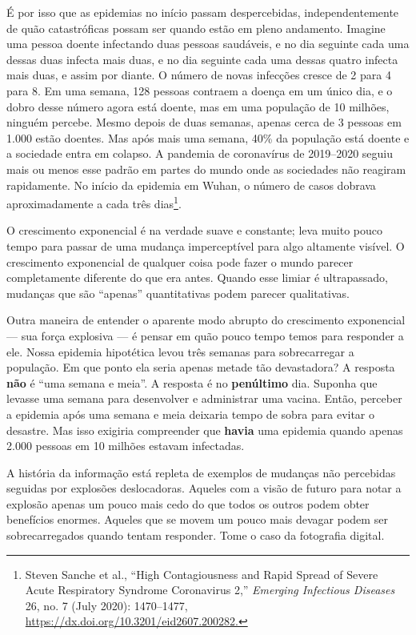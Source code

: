 É por isso que as epidemias no início passam despercebidas, independentemente de
quão catastróficas possam ser quando estão em pleno andamento. Imagine uma
pessoa doente infectando duas pessoas saudáveis, e no dia seguinte cada uma
dessas duas infecta mais duas, e no dia seguinte cada uma dessas quatro infecta 
mais duas, e assim por diante. O número de novas infecções cresce de 2 para 4 
para 8. Em uma semana, 128 pessoas contraem a doença em um único dia, e o dobro 
desse número agora está doente, mas em uma população de 10 milhões, ninguém 
percebe. Mesmo depois de duas semanas, apenas cerca de 3 pessoas em 1.000 estão 
doentes. Mas após mais uma semana, 40\% da população está doente e a sociedade 
entra em colapso. A pandemia de coronavírus de 2019--2020 seguiu mais ou menos 
esse padrão em partes do mundo onde as sociedades não reagiram rapidamente. No 
início da epidemia em Wuhan, o número de casos dobrava aproximadamente a cada 
três dias\footnote{Steven Sanche et al., ``High Contagiousness and Rapid Spread
of Severe Acute Respiratory Syndrome Coronavirus 2,'' \textit{Emerging
Infectious Diseases} 26, no. 7 (July 2020): 1470--1477,
\url{https://dx.doi.org/10.3201/eid2607.200282.}}.

O crescimento exponencial é na verdade suave e constante; leva muito pouco 
tempo para passar de uma mudança imperceptível para algo altamente visível. O 
crescimento exponencial de qualquer coisa pode fazer o mundo parecer 
completamente diferente do que era antes. Quando esse limiar é ultrapassado, 
mudanças que são ``apenas'' quantitativas podem parecer qualitativas.

Outra maneira de entender o aparente modo abrupto do crescimento exponencial ---
sua força explosiva --- é pensar em quão pouco tempo temos para responder a ele.
Nossa epidemia hipotética levou três semanas para sobrecarregar a população. Em 
que ponto ela seria apenas metade tão devastadora? A resposta \textbf{não} é
``uma semana e meia''. A resposta é no \textbf{penúltimo} dia. Suponha que
levasse uma semana para desenvolver e administrar uma vacina. Então, perceber a
epidemia após uma semana e meia deixaria tempo de sobra para evitar o
desastre. Mas isso exigiria compreender que \textbf{havia} uma epidemia quando
apenas 2.000 pessoas em 10 milhões estavam infectadas.

A história da informação está repleta de exemplos de mudanças não percebidas 
seguidas por explosões deslocadoras. Aqueles com a visão de futuro para notar a 
explosão apenas um pouco mais cedo do que todos os outros podem obter benefícios 
enormes. Aqueles que se movem um pouco mais devagar podem ser sobrecarregados 
quando tentam responder. Tome o caso da fotografia digital.


